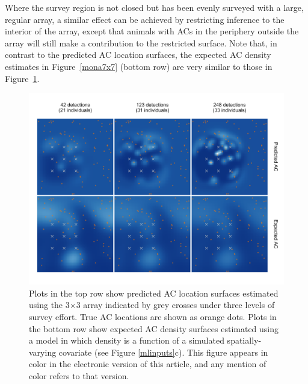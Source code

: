\documentclass[useAMS,usenatbib,referee]{biom}
\begin{document}
Where the survey region is not closed but has been evenly surveyed with a large, regular array, a similar effect can be achieved by restricting inference to the interior of the array, except that animals with ACs in the periphery outside the array will still make a contribution to the restricted surface. Note that, in contrast to the predicted AC location surfaces, the expected AC density estimates in Figure~\ref{mona7x7} (bottom row) are very similar to those in Figure~\ref{mona3x3}. 

\begin{figure}[htbp]
\centering
\includegraphics[width=1\textwidth]{mona_3x3.png}
\caption{Plots in the top row show predicted AC location surfaces estimated using the 3$\times$3 array indicated by grey crosses under three levels of survey effort. True AC locations are shown as orange dots. Plots in the bottom row show expected AC density surfaces estimated using a model in which density is a function of a simulated spatially-varying covariate (see Figure \ref{mlinputs}c). This figure appears in color in the electronic version of this article, and any mention of color refers to that version.}
\label{mona3x3}
\end{figure}
\end{document}
